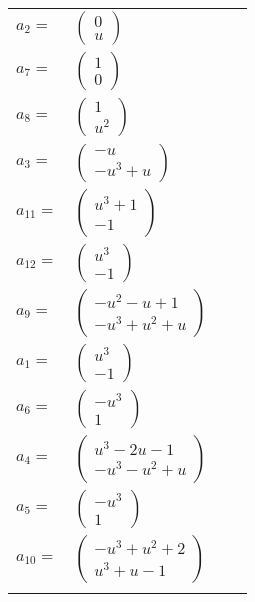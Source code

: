 \documentclass[1p]{elsarticle_modified}
\theoremstyle{definition}
\begin{document}
\begin{tabular}{m{7pt} m{180pt} m{7pt} m{180pt} }
\flushright $a_{2}=$&$\begin{pmatrix}0\\u\end{pmatrix}$ \\
\flushright $a_{7}=$&$\begin{pmatrix}1\\0\end{pmatrix}$ \\
\flushright $a_{8}=$&$\begin{pmatrix}1\\u^2\end{pmatrix}$ \\
\flushright $a_{3}=$&$\begin{pmatrix}- u\\- u^3+u\end{pmatrix}$ \\
\flushright $a_{11}=$&$\begin{pmatrix}u^3+1\\-1\end{pmatrix}$ \\
\flushright $a_{12}=$&$\begin{pmatrix}u^3\\-1\end{pmatrix}$ \\
\flushright $a_{9}=$&$\begin{pmatrix}- u^2- u+1\\- u^3+u^2+u\end{pmatrix}$ \\
\flushright $a_{1}=$&$\begin{pmatrix}u^3\\-1\end{pmatrix}$ \\
\flushright $a_{6}=$&$\begin{pmatrix}- u^3\\1\end{pmatrix}$ \\
\flushright $a_{4}=$&$\begin{pmatrix}u^3-2 u-1\\- u^3- u^2+u\end{pmatrix}$ \\
\flushright $a_{5}=$&$\begin{pmatrix}- u^3\\1\end{pmatrix}$ \\
\flushright $a_{10}=$&$\begin{pmatrix}- u^3+u^2+2\\u^3+u-1\end{pmatrix}$\\&\end{tabular}
\end{document}
